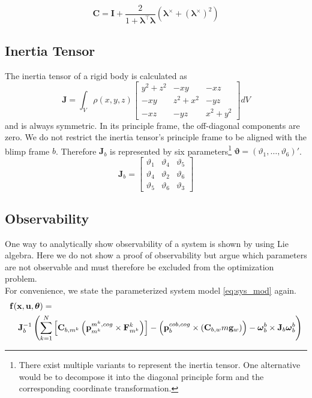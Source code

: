 \begin{equation}
\label{eq:rod_to_C}
\mathbf{C} = \mathbf{I} + \frac{2}{1+\boldsymbol{\lambda}^\top \boldsymbol{\lambda}}
\left(\boldsymbol{\lambda}^\times + \left(\boldsymbol{\lambda}^\times\right)^2\right)
\end{equation}

\subsection{Inertia Tensor}
\label{sub:par_inertia}
The inertia tensor of a rigid body is calculated as
\begin{equation}
\mathbf{J} = \int_V \rho(x,y,z) 
\left[ \begin{array}{ccc}
y^2+z^2 & - xy    & - xz \\
- xy    & z^2+x^2 & - yz \\
- xz    & - yz    & x^2+y^2
\end{array} \right] dV
\end{equation}
and is always symmetric.
In its principle frame, the off-diagonal components are zero.
We do not restrict the inertia tensor's principle frame to be aligned with the blimp frame $b$.
Therefore $\mathbf{J}_b$ is represented by six parameters\footnote{
There exist multiple variants to represent the inertia tensor. One alternative would be to decompose it into the diagonal principle form and the corresponding coordinate transformation.
}
$\boldsymbol{\vartheta} = (\vartheta_1, \hdots, \vartheta_6)'$.
\begin{equation}
\mathbf{J}_b = 
\left[ \begin{array}{ccc}
\vartheta_1 & \vartheta_4 & \vartheta_5 \\
\vartheta_4 & \vartheta_2 & \vartheta_6 \\
\vartheta_5 & \vartheta_6 & \vartheta_3
\end{array} \right]
\end{equation}


\subsection{Observability}
\label{sub:observability}
One way to analytically show observability of a system is shown by \citet{hermann1977} using Lie algebra. 
Here we do not show a proof of observability but argue which parameters are not observable and must therefore be excluded from the optimization problem.
\\
For convenience, we state the parameterized system model \cref{eq:sys_mod} again.
\begin{align*}
\lefteqn{ \mathbf{f}(\mathbf{x}, \mathbf{u}, \boldsymbol{\theta}) = {} }\\
& & {} \mathbf{J}_b^{-1} \left( 
\sum_{k=1}^N  \left[  \mathbf{C}_{b,m^k} \left( \mathbf{p}^{m^k,cog}_{m^k} \times \mathbf{F}^k_{m^k} \right)  \right]
-
\left( \mathbf{p}^{cob,cog}_b \times (\mathbf{C}_{b,w}m\mathbf{g}_w) \right)
- \boldsymbol{\omega}_b^b \times \mathbf{J}_b \boldsymbol{\omega}_b^b \right) \nonumber
\end{align*}

